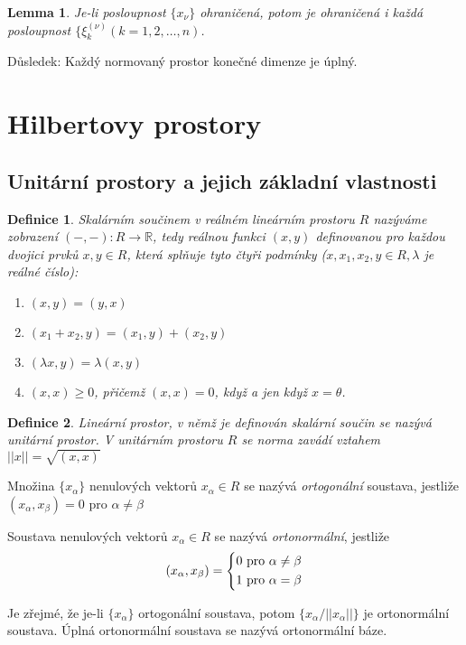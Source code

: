 \documentclass[a4paper, 11pt]{report}
\newtheorem{mydef}{Definice}[chapter]
\newtheorem{lemma}{Lemma}[chapter]
\begin{document}
\begin{lemma}
Je-li posloupnost $\{x_\nu\}$ ohraničená, potom je ohraničená i každá posloupnost $\{\xi_k^{(\nu)} (k = 1, 2, \dots, n)$.
\end{lemma}

Důsledek: Každý normovaný prostor konečné dimenze je úplný.

\section{Hilbertovy prostory}
\subsection{Unitární prostory a jejich základní vlastnosti}

\begin{mydef}
Skalárním součinem v reálném lineárním prostoru $R$ nazýváme zobrazení $(-, -): R \to \mathbb{R}$, tedy reálnou funkci $(x, y)$ definovanou pro každou dvojici prvků $x, y \in R$, která splňuje tyto čtyři podmínky ($x, x_1, x_2, y \in R, \lambda $ je reálné číslo):
\begin{enumerate}
	\item $(x, y) = (y, x)$
	\item $(x_1 + x_2, y) = (x_1, y) + (x_2, y)$
	\item $(\lambda x, y) = \lambda(x, y)$
	\item $(x, x) \geq 0$, přičemž $(x,x) = 0$, když a jen když $x = \theta$.
\end{enumerate}
\end{mydef}

\begin{mydef}
Lineární prostor, v němž je definován skalární součin se nazývá \emph{unitární prostor}. V unitárním prostoru $R$ se norma zavádí vztahem
$||x|| = \sqrt{(x, x)}$
\end{mydef}

Množina $\{ x_\alpha \}$ nenulových vektorů $x_\alpha \in R$ se nazývá \emph{ortogonální} soustava, jestliže
$(x_\alpha, x_\beta) = 0$ pro $\alpha \not= \beta$

Soustava nenulových vektorů $x_\alpha \in R$ se nazývá \emph{ortonormální}, jestliže
$$(x_\alpha, x_\beta) = \begin{dcases}
0 \text{ pro } \alpha \not= \beta \\
1 \text{ pro } \alpha = \beta
\end{dcases}$$

Je zřejmé, že je-li $\{x_\alpha\}$ ortogonální soustava, potom $\{x_\alpha / ||x_\alpha|| \}$ je ortonormální soustava. Úplná ortonormální soustava se nazývá ortonormální báze.
\end{document}
